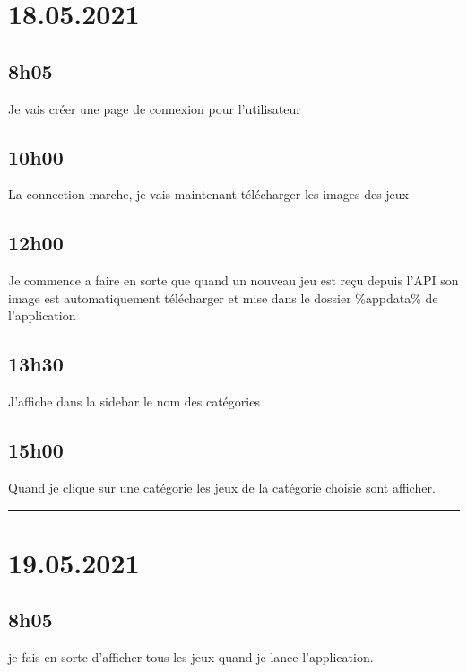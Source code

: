 \documentclass[a4paper,12pt,french]{sphinxmanual}
\begin{document}
\section{18.05.2021}
\label{\detokenize{logbook:id123}}

\subsection{8h05}
\label{\detokenize{logbook:id124}}
\sphinxAtStartPar
Je vais créer une page de connexion pour l’utilisateur


\subsection{10h00}
\label{\detokenize{logbook:id125}}
\sphinxAtStartPar
La connection marche, je vais maintenant télécharger les images des jeux


\subsection{12h00}
\label{\detokenize{logbook:id126}}
\sphinxAtStartPar
Je commence a faire en sorte que quand un nouveau jeu est reçu depuis l’API son image est automatiquement télécharger et mise dans le dossier \%appdata\% de l’application


\subsection{13h30}
\label{\detokenize{logbook:id127}}
\sphinxAtStartPar
J’affiche dans la sidebar le nom des catégories


\subsection{15h00}
\label{\detokenize{logbook:id128}}
\sphinxAtStartPar
Quand je clique sur une catégorie les jeux de la catégorie choisie sont afficher.


\bigskip\hrule\bigskip



\section{19.05.2021}
\label{\detokenize{logbook:id129}}

\subsection{8h05}
\label{\detokenize{logbook:id130}}
\sphinxAtStartPar
je fais en sorte d’afficher tous les jeux quand je lance l’application.
\end{document}
